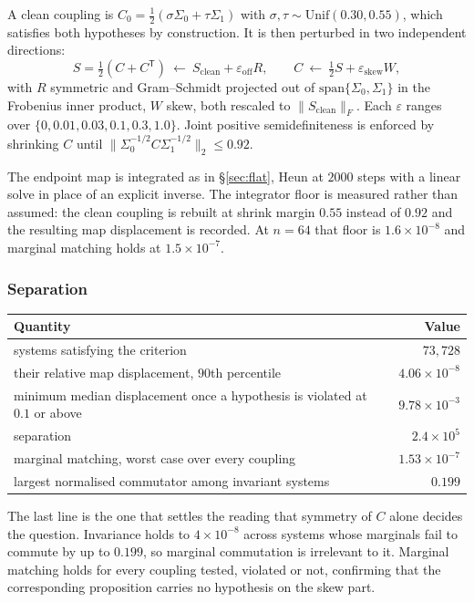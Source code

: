 \documentclass[11pt]{article}
\newcommand{\T}{\mathsf{T}}
\begin{document}
A clean coupling is $C_0=\tfrac12(\sigma\Sigma_0+\tau\Sigma_1)$ with
$\sigma,\tau\sim\mathrm{Unif}(0.30,0.55)$, which satisfies both hypotheses by construction. It is
then perturbed in two independent directions:
\[
S=\tfrac12(C+C^{\T})\ \leftarrow\ S_{\mathrm{clean}}+\varepsilon_{\mathrm{off}}R,\qquad
C\ \leftarrow\ \tfrac12 S+\varepsilon_{\mathrm{skew}}W,
\]
with $R$ symmetric and Gram--Schmidt projected out of $\mathrm{span}\{\Sigma_0,\Sigma_1\}$ in the
Frobenius inner product, $W$ skew, both rescaled to $\|S_{\mathrm{clean}}\|_F$. Each
$\varepsilon$ ranges over $\{0,0.01,0.03,0.1,0.3,1.0\}$. Joint positive semidefiniteness is
enforced by shrinking $C$ until $\|\Sigma_0^{-1/2}C\Sigma_1^{-1/2}\|_2\le0.92$.

The endpoint map is integrated as in \S\ref{sec:flat}, Heun at $2000$ steps with a linear solve
in place of an explicit inverse. The integrator floor is measured rather than assumed: the clean
coupling is rebuilt at shrink margin $0.55$ instead of $0.92$ and the resulting map displacement
is recorded. At $n=64$ that floor is $1.6\times10^{-8}$ and marginal matching holds at
$1.5\times10^{-7}$.

\subsubsection*{Separation}

\begin{center}
\begin{tabular}{@{}lr@{}}
\toprule
Quantity & Value\\
\midrule
systems satisfying the criterion & $73{,}728$\\
their relative map displacement, $90$th percentile & $4.06\times10^{-8}$\\
minimum median displacement once a hypothesis is violated at $0.1$ or above & $9.78\times10^{-3}$\\
separation & $2.4\times10^{5}$\\
marginal matching, worst case over every coupling & $1.53\times10^{-7}$\\
largest normalised commutator among invariant systems & $0.199$\\
\bottomrule
\end{tabular}
\end{center}

The last line is the one that settles the reading that symmetry of $C$ alone decides the question.
Invariance holds to $4\times10^{-8}$ across systems whose marginals fail to commute by up to
$0.199$, so marginal commutation is irrelevant to it. Marginal matching holds for every coupling
tested, violated or not, confirming that the corresponding proposition carries no hypothesis on
the skew part.
\end{document}
